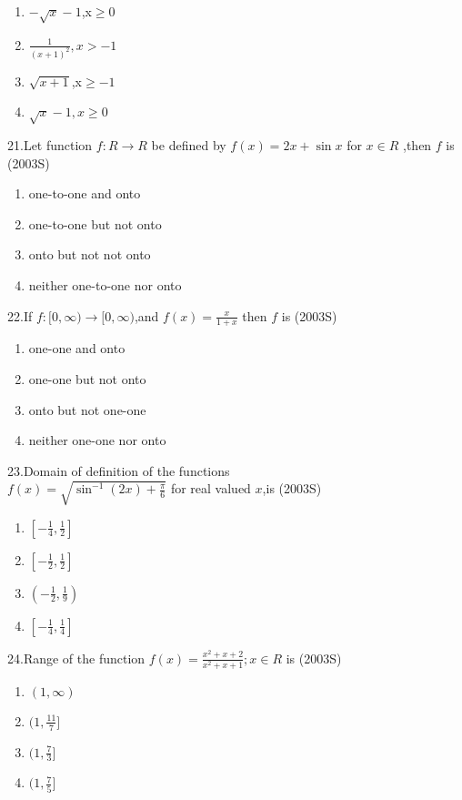 \documentclass[journal,12pt,twocolumn]{IEEEtran}
\theoremstyle{remark}
\begin{document}
\begin{enumerate}
    \item $-\sqrt{x}-1$,x$\geq$0
    \item $\frac{1}{(x+1)^2},x>-1$
    \item $\sqrt{x+1}$,x$\geq -1$
    \item $\sqrt{x} -1,x\geq 0$
\end{enumerate}
21.Let function $f:R\rightarrow R$ be defined by $f(x)=2x + \sin x$ for $x\in R$ ,then $f$ is
\hfill(2003S)\\
\begin{enumerate}
    \item one-to-one and onto
    \item one-to-one but not onto
    \item onto but not not onto
    \item neither one-to-one nor onto
\end{enumerate}
22.If $f:[0,\infty) \rightarrow [0,\infty)$,and $f(x)=\frac{x}{1+x}$ then $f$ is
\hfill(2003S)\\
\begin{enumerate}
    \item one-one and onto
    \item one-one but not onto
    \item onto but not one-one
    \item neither one-one nor onto
\end{enumerate}
23.Domain of definition of the functions\\ $f(x)=\sqrt{\sin^{-1}(2x)+\frac{\pi}{6}}$ for real valued $x$,is
\hfill(2003S)\\
\begin{enumerate}
    \item$\left[-\frac{1}{4},\frac{1}{2}\right]$\\
    \item$\left[-\frac{1}{2},\frac{1}{2}\right]$\\
    \item$\left(-\frac{1}{2},\frac{1}{9}\right)$\\
    \item$\left[-\frac{1}{4},\frac{1}{4}\right]$
\end{enumerate}
24.Range of the function $f(x)=\frac{x^2+x+2}{x^2+x+1};x\in R$ is
\hfill(2003S)\\
\begin{enumerate}
    \item $(1,\infty)$
    \item $(1,\frac{11}{7}]$
    \item $(1,\frac{7}{3}]$
    \item $(1,\frac{7}{5}]$
\end{enumerate}
\end{document}
